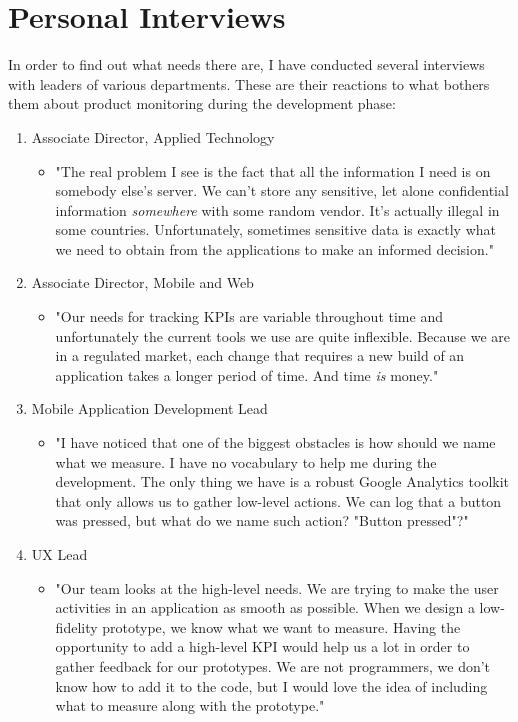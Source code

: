 \section{Personal Interviews}

In order to find out what needs there are, I have conducted several interviews with leaders of various departments. These are their reactions to what bothers them about product monitoring during the development phase:

\begin{enumerate}
		\item Associate Director, Applied Technology
		\begin{itemize}
				\item[] "The real problem I see is the fact that all the information I need is on somebody else's server. We can't store any sensitive, let alone confidential information \emph{somewhere} with some random vendor. It's actually illegal in some countries. Unfortunately, sometimes sensitive data is exactly what we need to obtain from the applications to make an informed decision."
		\end{itemize}	

		\item Associate Director, Mobile and Web
		\begin{itemize}
				\item[] "Our needs for tracking KPIs are variable throughout time and unfortunately the current tools we use are quite inflexible. Because we are in a regulated market, each change that requires a new build of an application takes a longer period of time. And time \emph{is} money."
		\end{itemize}				
		
		\item Mobile Application Development Lead
		\begin{itemize}
				\item[] "I have noticed that one of the biggest obstacles is how should we name what we measure. I have no vocabulary to help me during the development. The only thing we have is a robust Google Analytics toolkit that only allows us to gather low-level actions. We can log that a button was pressed, but what do we name such action? "Button pressed"?"
		\end{itemize}
		
		\item UX Lead
		\begin{itemize}
				\item[] "Our team looks at the high-level needs. We are trying to make the user activities in an application as smooth as possible. When we design a low-fidelity prototype, we know what we want to measure. Having the opportunity to add a high-level KPI would help us a lot in order to gather feedback for our prototypes. We are not programmers, we don't know how to add it to the code, but I would love the idea of including what to measure along with the prototype."
		\end{itemize}
\end{enumerate}

